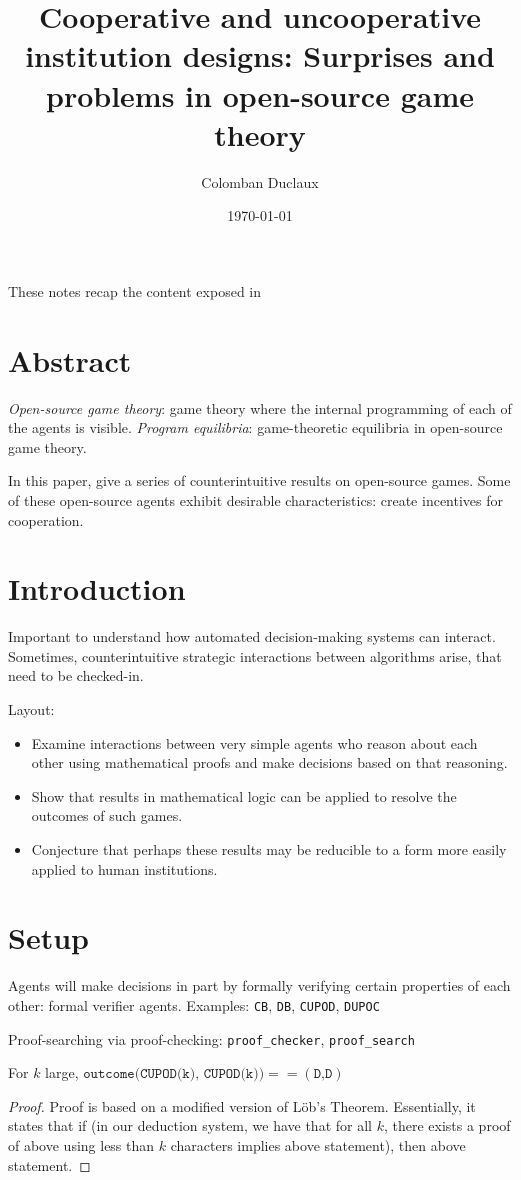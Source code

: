 \documentclass{article}
\title{Cooperative and uncooperative institution designs: Surprises and problems in open-source game theory}
\author{Colomban Duclaux}
\date{\today}
\begin{document}
\maketitle
These notes recap the content exposed in \cite{critch2022cooperativeuncooperativeinstitutiondesigns}

\section{Abstract}
\textit{Open-source game theory}: game theory where the internal programming of each of the agents is visible.
\textit{Program equilibria}: game-theoretic equilibria in open-source game theory.

In this paper, give a series of counterintuitive results on open-source games.
Some of these open-source agents exhibit desirable characteristics: create incentives for cooperation.

\section{Introduction}
Important to understand how automated decision-making systems can interact.
Sometimes, counterintuitive strategic interactions between algorithms arise, that need to be checked-in.

Layout: \begin{itemize}
    \item Examine interactions between very simple agents who reason about each other using mathematical proofs and make decisions based on that reasoning.
    \item Show that results in mathematical logic can be applied to resolve the outcomes of such games.
    \item Conjecture that perhaps these results may be reducible to a form more easily applied to human institutions.
\end{itemize}

\section{Setup}
Agents will make decisions in part by formally verifying certain properties of each other: formal verifier agents. Examples: \texttt{CB}, \texttt{DB}, \texttt{CUPOD}, \texttt{DUPOC}

Proof-searching via proof-checking: \texttt{proof\_checker}, \texttt{proof\_search}


\begin{theorem} \label{thm:cupod-cupod}
    For $k$ large, $\texttt{outcome(CUPOD(k), CUPOD(k))} == (\texttt{D,D})$
\end{theorem}
\begin{proof}
    Proof is based on a modified version of Löb's Theorem. Essentially, it states that if (in our deduction system, we have that for all $k$, there exists a proof of above using less than $k$ characters implies above statement), then above statement.
\end{proof}
\end{document}
